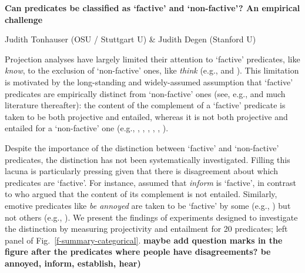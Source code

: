 \documentclass[12pt,fleqn]{article}
\newcommand{\6}{\mbox{$[\hspace*{-.6mm}[$}}
\newcommand{\9}{\mbox{$]\hspace*{-.6mm}]$}}
\begin{document}
 
 
\begin{center}
{\bf Can predicates be classified as `factive' and `non-factive'? An empirical challenge}

Judith Tonhauser (OSU / Stuttgart U) \& Judith Degen (Stanford U) 
\end{center}

\vspace*{-.2cm}


\noindent
Projection analyses have largely limited their attention to `factive' predicates, like {\em know}, to the exclusion of `non-factive' ones, like {\em think}  (e.g., \cite{heim83,vds92,abrusan2011,abrusan2016,romoli2015} and \cite{best-question}). This limitation is motivated by the long-standing and widely-assumed assumption that `factive' predicates are empirically distinct from `non-factive' ones (see, e.g., \cite{karttunen71b,kiparsky-kiparsky71} and much literature thereafter): the content of the complement of a `factive' predicate is taken to be both projective and entailed, whereas it is not both projective and entailed for a `non-factive' one (e.g., \cite{gazdar79a}, \cite{ccmg90}, \cite{vds92},  \cite{schlenker10}, \cite{anand-hacquard2014}, \cite{spector-egre2015}). 

Despite the importance of the distinction between `factive' and `non-factive' predicates, the distinction has not been systematically investigated. Filling this lacuna is particularly pressing given that there is disagreement about which predicates are `factive'. For instance, \cite{schlenker10} assumed that {\em inform} is `factive', in contrast to \cite{anand-hacquard2014} who argued that the content of its complement is not entailed. Similarly, emotive predicates like {\em be annoyed} are taken to be `factive' by some (e.g., \cite{gazdar79a,abrusan2011,anand-hacquard2014}) but not others (e.g., \cite{klein1975,giannakidou1998,schlenker2003,egre2008}). We present the findings of experiments designed to investigate the distinction by measuring projectivity and entailment for 20 predicates; left panel of Fig.\ \ref{f-summary-categorical}. {\bf maybe add question marks in the figure after the predicates where people have disagreements? be annoyed, inform, establish, hear)}
\end{document}
